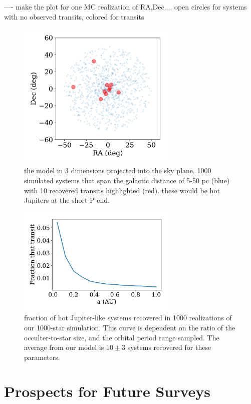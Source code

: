 \documentclass[modern]{aastex61}
\begin{document}
---- make the plot for one MC realization of RA,Dec.... open circles for systems with no observed transits, colored for transits

\begin{figure}[]
\centering
\includegraphics[width=3in]{../figures/3d_model.pdf}
\caption{the model in 3 dimensions projected into the sky plane. 1000 simulated systems that span the galactic distance of 5-50 pc (blue) with 10 recovered transits highlighted (red). these would be hot Jupiters at the short P end.}
\label{fig:3d}
\end{figure}

\begin{figure}[]
\centering
\includegraphics[width=3in]{../figures/recov_fraction.pdf}
\caption{fraction of hot Jupiter-like systems recovered in 1000 realizations of our 1000-star simulation. This curve is dependent on the ratio of the occulter-to-star size, and the orbital period range sampled.
The average from our model is $10\pm 3$ systems recovered for these parameters.}
\label{fig:recov}
\end{figure}


\section{Prospects for Future Surveys}
\end{document}
